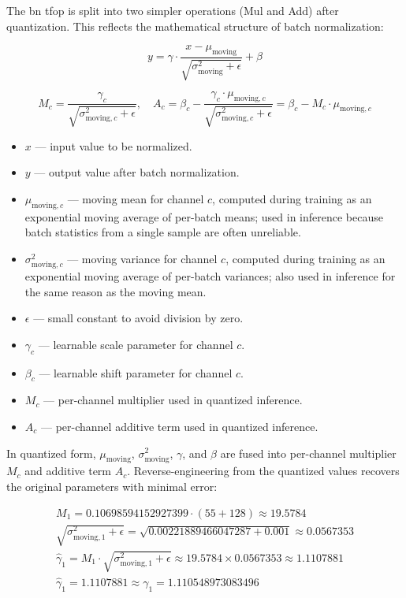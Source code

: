 {The \gls{bn} \gls{tfop} is split into two simpler operations (Mul and Add) after quantization. This reflects the mathematical structure of batch normalization:

\begin{equation}
y = \gamma \cdot \frac{x - \mu_{\text{moving}}}{\sqrt{\sigma^2_{\text{moving}} + \epsilon}} + \beta
\label{eq:bn}
\end{equation}

\begin{equation}
M_c = \frac{\gamma_c}{\sqrt{\sigma^2_{\text{moving},c} + \epsilon}}, 
\quad
A_c = \beta_c - \frac{\gamma_c \cdot \mu_{\text{moving},c}}{\sqrt{\sigma^2_{\text{moving},c} + \epsilon}}
      = \beta_c - M_c \cdot \mu_{\text{moving},c}
\label{eq:bnquant}
\end{equation}

\begin{itemize}
    \item $x$ — input value to be normalized.
    \item $y$ — output value after batch normalization.
    \item $\mu_{\text{moving},c}$ — moving mean for channel $c$, computed during training as an exponential moving average of per-batch means; used in inference because batch statistics from a single sample are often unreliable.
    \item $\sigma^2_{\text{moving},c}$ — moving variance for channel $c$, computed during training as an exponential moving average of per-batch variances; also used in inference for the same reason as the moving mean.
    \item $\epsilon$ — small constant to avoid division by zero.
    \item $\gamma_c$ — learnable scale parameter for channel $c$.
    \item $\beta_c$ — learnable shift parameter for channel $c$.
    \item $M_c$ — per-channel multiplier used in quantized inference.
    \item $A_c$ — per-channel additive term used in quantized inference.
\end{itemize}

In quantized form, $\mu_{\text{moving}}$, $\sigma^2_{\text{moving}}$, $\gamma$, and $\beta$ are fused into per-channel multiplier $M_c$ and additive term $A_c$. Reverse-engineering from the quantized values recovers the original parameters with minimal error:

\begin{equation*}
\begin{gathered}
M_1 = 0.10698594152927399 \cdot (55 + 128) \approx 19.5784 \\
\sqrt{\sigma^2_{\text{moving},1} + \epsilon} = \sqrt{0.00221889466047287 + 0.001} \approx 0.0567353 \\
\hat{\gamma}_1 = M_1 \cdot \sqrt{\sigma^2_{\text{moving},1} + \epsilon} \approx 19.5784 \times 0.0567353 \approx 1.1107881 \\
\hat{\gamma}_1 = 1.1107881 \approx \gamma_1 = 1.110548973083496
\end{gathered}
\end{equation*}


}
